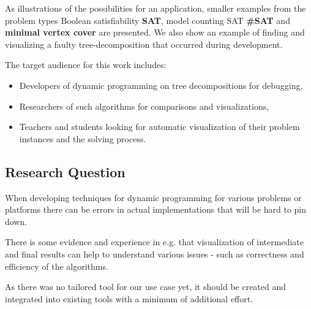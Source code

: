 \documentclass[a4paper, 12pt, bibliography=totoc]{scrartcl}
\begin{document}
As illustrations of the possibilities for an application, smaller examples from the problem types Boolean satisfiability \textbf{SAT}, model counting SAT \textbf{\#SAT} and \textbf{minimal vertex cover} are presented.
We also show an example of finding  and visualizing a faulty tree-decomposition that occurred during development.


The target audience for this work includes: 
\begin{itemize}
	\item Developers of dynamic programming on tree decompositions for debugging,
	\item Researchers of such algorithms for comparisons and visualizations,
	\item Teachers and students looking for automatic visualization of their problem instances and the solving process.
\end{itemize} 


\subsection{Research Question}
When developing techniques for dynamic programming for various problems or platforms there can be errors in actual implementations that will be hard to pin down. 

There is some evidence and experience in e.g. \cite{SoftwareVisualization, ELVIZ} that visualization of intermediate and final results can help to understand various issues - such as correctness and efficiency of the algorithms.

As there was no tailored tool for our use case yet, it should be created and integrated into existing tools with a minimum of additional effort.
\end{document}
